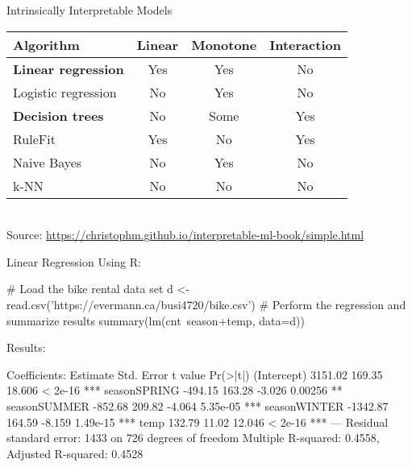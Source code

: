 \documentclass[ignorenonframetext,xcolor=x11names]{beamer}
\begin{document}

\begin{frame}{Intrinsically Interpretable Models}

\centering
\renewcommand{\arraystretch}{1.1}

\begin{tabular}{lccc} \hline
Algorithm & Linear & Monotone & Interaction \\ \hline
\textbf{Linear regression} & Yes & Yes & No  \\ 
Logistic regression & No & Yes & No  \\
\textbf{Decision trees} & No & Some & Yes  \\
RuleFit & Yes & No & Yes  \\
Naive Bayes & No & Yes & No \\
k-NN & No & No & No  \\ \hline
\end{tabular} \\

\scriptsize Source: \url{https://christophm.github.io/interpretable-ml-book/simple.html}\normalsize
\end{frame}

\begin{frame}[fragile]{Linear Regression}
Using R:
\begin{Rcode}
# Load the bike rental data set
d <- read.csv('https://evermann.ca/busi4720/bike.csv')
# Perform the regression and summarize results
summary(lm(cnt~season+temp, data=d))
\end{Rcode}
Results:
\begin{textcode}
Coefficients:
             Estimate Std. Error t value Pr(>|t|)    
(Intercept)   3151.02     169.35  18.606  < 2e-16 ***
seasonSPRING  -494.15     163.28  -3.026  0.00256 ** 
seasonSUMMER  -852.68     209.82  -4.064 5.35e-05 ***
seasonWINTER -1342.87     164.59  -8.159 1.49e-15 ***
temp           132.79      11.02  12.046  < 2e-16 ***
---
Residual standard error: 1433 on 726 degrees of freedom
Multiple R-squared: 0.4558, Adjusted R-squared: 0.4528 
\end{textcode}
\end{frame}
\end{document}
